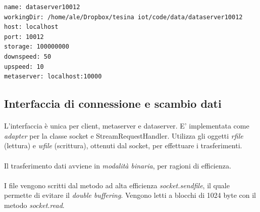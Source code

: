 \documentclass[11pt,a4paper,english]{article}
\begin{document}
\begin{lstlisting}[title=Esempio di configurazione]
name: dataserver10012
workingDir: /home/ale/Dropbox/tesina iot/code/data/dataserver10012
host: localhost
port: 10012
storage: 100000000
downspeed: 50
upspeed: 10
metaserver: localhost:10000
\end{lstlisting}


\subsection{Interfaccia di connessione e scambio dati}

\paragraph{} L'interfaccia è unica per client, metaserver e dataserver. E' implementata come \emph{adapter}\cite{adapter} per la classe socket e StreamRequestHandler. Utilizza gli oggetti \emph{rfile} (lettura) e \emph{wfile} (scrittura), ottenuti dal socket, per effettuare i trasferimenti. 

\paragraph{} Il trasferimento dati avviene in \emph{modalità binaria}, per ragioni di efficienza. 

\paragraph{} I file vengono scritti dal metodo ad alta efficienza \emph{socket.sendfile}, il quale permette di evitare il \emph{double buffering}. Vengono letti a blocchi di 1024 byte con il metodo \emph{socket.read}.
\end{document}
